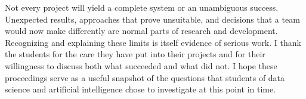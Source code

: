 Not every project will yield a complete system or an unambiguous success.
Unexpected results, approaches that prove unsuitable, and decisions that a
team would now make differently are normal parts of research and development.
Recognizing and explaining these limits is itself evidence of serious work.
I thank the students for the care they have put into their projects and for
their willingness to discuss both what succeeded and what did not. I hope
these proceedings serve as a useful snapshot of the questions that students
of data science and artificial intelligence chose to investigate at this
point in time.

